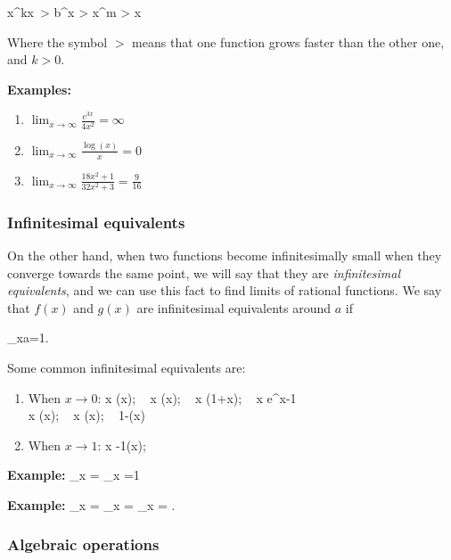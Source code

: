 \bnn
x^{kx}\  > b^x > x^m > \log x
\enn

Where the symbol $>$ means that one function grows faster than the other one, and $k>0$.

{\bf Examples:}
\begin{enumerate}
\item $\lim_{x\rightarrow \infty} \frac{e^{3x}}{4x^2}=\infty$
\item $\lim_{x\rightarrow \infty} \frac{\log(x)}{x}=0$
\item $\lim_{x\rightarrow \infty} \frac{18x^2+1}{32x^2+3}=\frac{9}{16}$
\end{enumerate}

\subsubsection{Infinitesimal equivalents}

On the other hand, when two functions become infinitesimally small when they
converge towards the same point, we will say that they are {\em infinitesimal equivalents},
and we can use this fact to find limits of rational functions. We say that $f(x)$ and 
$g(x)$ are infinitesimal equivalents around $a$ if

\bnn
	\lim_{x\rightarrow a}=1.	
\enn

Some common infinitesimal equivalents are:
\begin{enumerate}
 \item When $x \rightarrow 0$:
   \bnn
      x \simeq \sin(x); \mbox{  } x \simeq \tan(x); \mbox{  } x \simeq \log(1+x); \mbox{  } x \simeq e^x-1 \\
      x \simeq \arcsin(x); \mbox{  } x \simeq \arctan(x); \mbox{  } 1-\cos(x) \simeq {}
   \enn
    \item When $x \rightarrow 1$:
   \bnn
      x -1\simeq \log(x);
   \enn
\end{enumerate}

{\bf Example:}
\bnn
 	\lim_{x} = 	\lim_{x} =1
\enn

{\bf Example:}
\bnn
 	\lim_{x} = 	\lim_{x} = \lim_{x} = .
\enn

\subsubsection{Algebraic operations}

